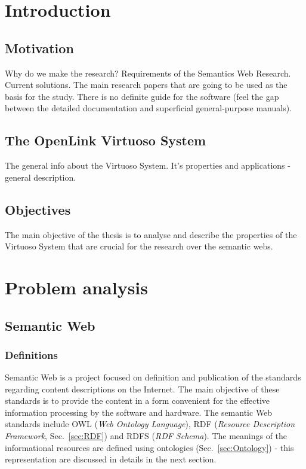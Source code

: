 \chapter{Introduction}

\section{Motivation}
Why do we make the research? 
Requirements of the Semantics Web Research. 
Current solutions.
The main research papers that are going to be used as the basis for the study.
There is no definite guide for the software (feel the gap between the detailed
documentation and superficial general-purpose manuals).

\section{The OpenLink Virtuoso System}
The general info about the Virtuoso System. It's properties and applications -
general description.

\section{Objectives}
\label{sec:Objectives}
The main objective of the thesis\cite{6079245} is to analyse and describe the
properties of the Virtuoso System that are crucial for the research over the
semantic webs.

\chapter{Problem analysis}
\label{chap:Problemanalysis}

\section{Semantic Web}

\subsection{Definitions}
Semantic Web is a project focused on definition and publication of the standards
regarding content descriptions on the Internet. The main objective of these
standards is to provide the content in a form convenient for the effective
information processing by the software and hardware. The semantic Web
standards include OWL (\textit{Web Ontology Language}), RDF (\textit{Resource
Description Framework}, Sec.~\ref{sec:RDF}) and RDFS (\textit{RDF Schema}).
The meanings of the informational resources are defined using
ontologies (Sec.~\ref{sec:Ontology}) - this representation are discussed in
details in the next section.

